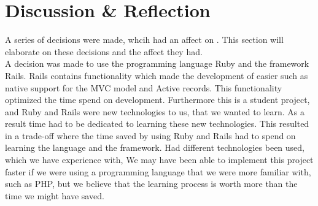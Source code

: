 













\section{Discussion \& Reflection}
\label{sec:discussion}
A series of decisions were made, whcih had an affect on \projectname{}.
This section will elaborate on these decisions and the affect they had. \\

A decision was made to use the programming language Ruby and the framework \ac{Rails}.
Rails contains functionality which made the development of \projectname{} easier such as native support for the MVC model and Active records.
This functionality optimized the time spend on development.
Furthermore this is a student project, and Ruby and Rails were new technologies to us, that we wanted to learn.
As a result time had to be dedicated to learning these new technologies.
This resulted in a trade-off where the time saved by using Ruby and Rails had to spend on learning the language and the framework.
Had different technologies been used, which we have experience with, 
We may have been able to implement this project faster if we were using a programming language that we were more familiar with, such as PHP, but we believe that the learning process is worth more than the time we might have saved. \\

